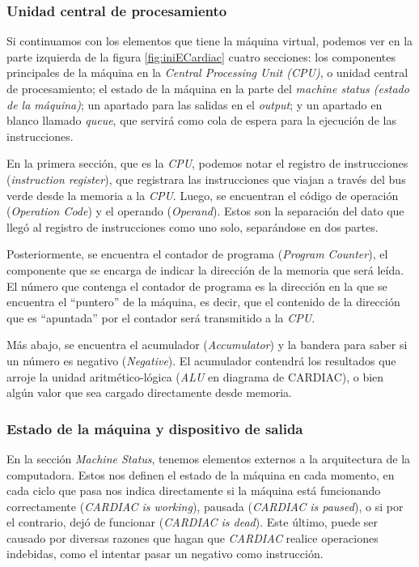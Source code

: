 \documentclass[letterpaper,12pt,oneside]{book}
\begin{document}
	
    \subsubsection{Unidad central de procesamiento}
    
	Si continuamos con los elementos que tiene la máquina virtual, podemos ver en la parte izquierda de la figura \ref{fig:iniECardiac}  cuatro secciones: los
	componentes principales de la máquina en la \textit{Central Processing Unit (CPU)}, o unidad central de procesamiento;
	 el estado de la máquina en la parte del \textit{machine status (estado de la máquina)}; un apartado para las salidas en el \textit{output}; y un apartado en 
	blanco llamado \textit{queue}, que servirá como cola de espera para la ejecución de las instrucciones.
 
    En la primera sección, que es la \textit{CPU}, podemos notar el
	registro de instrucciones (\textit{instruction register}), que registrara las instrucciones que viajan a través del bus verde desde la memoria a la \textit{CPU}. Luego, se encuentran el 
	código de operación (\textit{Operation Code}) y el operando (\textit{Operand}). Estos son la separación del dato que llegó al registro de 
	instrucciones como uno solo, separándose en dos partes. 
 
    Posteriormente, se encuentra el contador de programa (\textit{Program Counter}), el componente que se 
	encarga de indicar la dirección de la memoria que será leída. El número que contenga el contador de programa es la dirección en la que se encuentra
	el ``puntero'' de la máquina, es decir, que el contenido de la dirección que es ``apuntada'' por el contador será transmitido a la \textit{CPU}.
 
    Más abajo, se
	encuentra el acumulador (\textit{Accumulator}) y la bandera para saber si un número es negativo (\textit{Negative}). El acumulador contendrá los resultados que arroje
	la unidad aritmético-lógica (\textit{ALU} en diagrama de CARDIAC), o bien algún valor que sea cargado directamente desde memoria.
	
	\subsubsection{Estado de la máquina y dispositivo de salida}                                         
	
	En la sección \textit{Machine Status}, tenemos elementos externos a la arquitectura de la computadora. Estos nos definen el
	estado de la máquina en cada momento, en cada ciclo que pasa nos indica directamente si la máquina está funcionando correctamente (\textit{CARDIAC is working}),
	pausada (\textit{CARDIAC is paused}), o si por el contrario, dejó de funcionar (\textit{CARDIAC is dead}). Este último, puede ser causado por diversas razones
	que hagan que \textit{CARDIAC} realice operaciones indebidas, como el intentar pasar un negativo como instrucción. 
	
\end{document}
